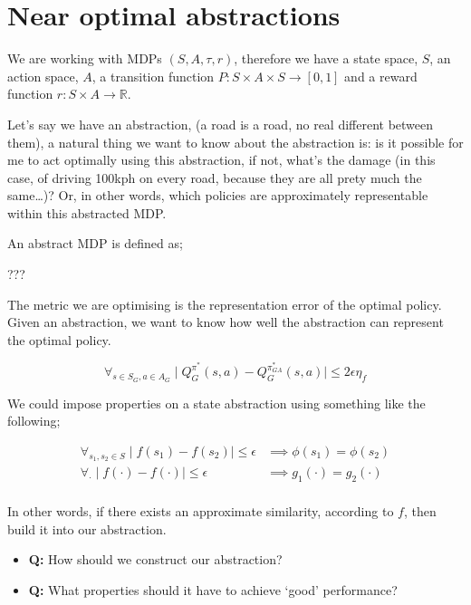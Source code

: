 \hypertarget{near-optimal-abstractions}{%
\section{Near optimal abstractions}\label{near-optimal-abstractions}}


We are working with MDPs \((S, A, \tau, r)\), therefore we have a state
space, \(S\), an action space, \(A\), a transition function
\(P: S\times A \times S \to [0, 1]\) and a reward function
\(r: S\times A \to \mathbb R\).

Let's say we have an abstraction, (a road is a road, no real different
between them), a natural thing we want to know about the abstraction is:
is it possible for me to act optimally using this abstraction, if not,
what's the damage (in this case, of driving 100kph on every road,
because they are all prety much the same\ldots{})? Or, in other words,
which policies are approximately representable within this abstracted
MDP.

An abstract MDP is defined as;

???

The metric we are optimising is the representation error of the optimal
policy. Given an abstraction, we want to know how well the abstraction
can represent the optimal policy.

\[
\forall_{s\in S_G, a\in A_G} \mid Q_G^{\pi^* }(s, a) - Q_G^{\pi_{GA}^* }(s, a) \mid \le 2 \epsilon \eta_f
\]

We could impose properties on a state abstraction using something like
the following;


\begin{align}
\forall_{s_1, s_2 \in S} \mid f(s_1) - f(s_2)\mid \le \epsilon &\implies \phi (s_1) = \phi(s_2)\\
\forall_{\cdot} \mid f(\cdot) - f(\cdot)\mid \le \epsilon &\implies g_1(\cdot) = g_2(\cdot)\\
\end{align}


In other words, if there exists an approximate similarity, according to
\(f\), then build it into our abstraction.

\begin{itemize}
\tightlist
\item
  \textbf{Q:} How should we construct our abstraction?
\item
  \textbf{Q:} What properties should it have to achieve `good'
  performance?
\end{itemize}

